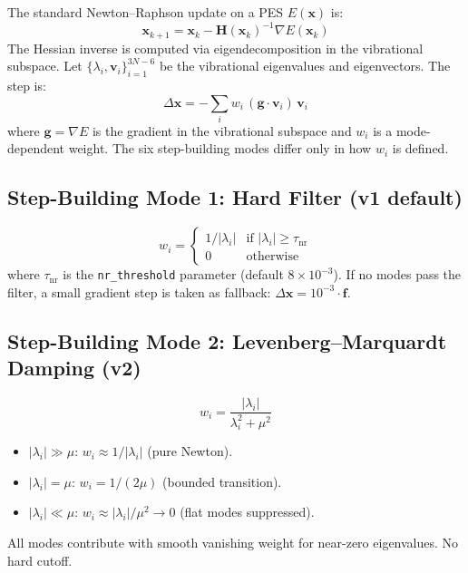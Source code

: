 \documentclass[11pt,a4paper]{article}
\newcommand{\vect}[1]{\mathbf{#1}}
\newcommand{\mat}[1]{\mathbf{#1}}
\newcommand{\grad}{\nabla}
\newcommand{\hess}{\mat{H}}
\newcommand{\evec}{\vect{v}}
\newcommand{\eval}{\lambda}
\begin{document}
The standard Newton--Raphson update on a PES $E(\vect{x})$ is:
\begin{equation}
  \vect{x}_{k+1} = \vect{x}_k - \hess(\vect{x}_k)^{-1} \grad E(\vect{x}_k)
  \label{eq:nr-basic}
\end{equation}
The Hessian inverse is computed via eigendecomposition in the vibrational subspace. Let $\{\eval_i, \evec_i\}_{i=1}^{3N-6}$ be the vibrational eigenvalues and eigenvectors. The step is:
\begin{equation}
  \Delta\vect{x} = -\sum_{i} w_i \, (\vect{g} \cdot \evec_i) \, \evec_i
  \label{eq:nr-spectral}
\end{equation}
where $\vect{g} = \grad E$ is the gradient in the vibrational subspace and $w_i$ is a mode-dependent weight. The six step-building modes differ only in how $w_i$ is defined.

\subsection{Step-Building Mode 1: Hard Filter (v1 default)}
\label{sec:hard-filter}

\begin{equation}
  w_i = \begin{cases}
    1/|\eval_i| & \text{if } |\eval_i| \geq \tau_\text{nr} \\
    0 & \text{otherwise}
  \end{cases}
  \label{eq:hard-filter}
\end{equation}
where $\tau_\text{nr}$ is the \texttt{nr\_threshold} parameter (default $8 \times 10^{-3}$). If no modes pass the filter, a small gradient step is taken as fallback: $\Delta\vect{x} = 10^{-3} \cdot \vect{f}$.

\subsection{Step-Building Mode 2: Levenberg--Marquardt Damping (v2)}
\label{sec:lm-damping}

\begin{equation}
  w_i = \frac{|\eval_i|}{\eval_i^2 + \mu^2}
  \label{eq:lm-weight}
\end{equation}
\begin{itemize}
  \item $|\eval_i| \gg \mu$: $w_i \approx 1/|\eval_i|$ (pure Newton).
  \item $|\eval_i| = \mu$: $w_i = 1/(2\mu)$ (bounded transition).
  \item $|\eval_i| \ll \mu$: $w_i \approx |\eval_i|/\mu^2 \to 0$ (flat modes suppressed).
\end{itemize}
All modes contribute with smooth vanishing weight for near-zero eigenvalues. No hard cutoff.
\end{document}
